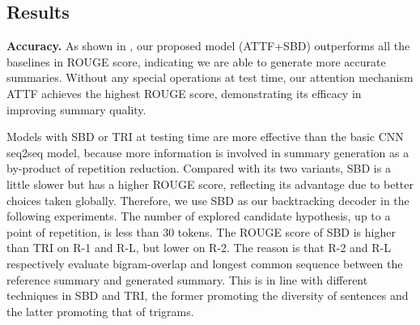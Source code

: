 \subsection{Results}
\label{sec:result}

\textbf{Accuracy.} As shown in , 
our proposed model (ATTF+SBD)
outperforms all the baselines in ROUGE score, indicating we are able to generate more
accurate summaries. Without any special operations at test time, our attention
mechanism ATTF achieves the highest ROUGE score, demonstrating
its efficacy in improving summary quality.

Models with SBD or TRI at testing time
are more effective than the basic CNN seq2seq model,
because more information is involved in summary generation 
as a by-product of repetition reduction.
Compared with its two variants, SBD is a little slower 
but has a higher ROUGE score, reflecting its advantage due to
better choices taken globally.
Therefore, 
we use SBD as our backtracking decoder in the following experiments. 
The number of explored candidate hypothesis, up to a point of
repetition, is less than 30 tokens.
The ROUGE score of SBD is higher than TRI on R-1 and R-L, but lower on R-2. 
The reason is that R-2 and R-L respectively evaluate
bigram-overlap and longest common sequence between the reference
summary and generated summary. This is in line with different techniques 
in SBD and TRI, the former promoting the diversity of sentences and 
the latter promoting that of trigrams.


